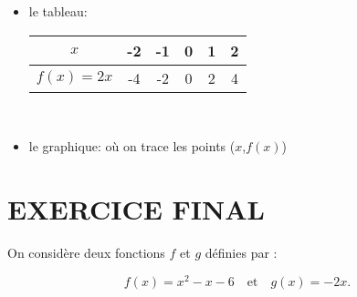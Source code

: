 \documentclass{article}
\begin{document}
\begin{itemize}
    \item le tableau:
   \begin{center}
    \begin{tabular}{|c|c|c|c|c|c|}
        \hline
        \( x \) & -2 & -1 & 0 & 1 & 2 \\ 
        \hline
        \( f(x) = 2x \) & -4 & -2 & 0 & 2 & 4 \\ 
        \hline
    \end{tabular}\\
\end{center}
    \item le graphique: où on trace les points ($x$,$f(x)$)
\begin{center}
\end{center}

\end{itemize}

\section{EXERCICE FINAL}
On considère deux fonctions \( f \) et \( g \) définies par :

\[
f(x) = x^2 - x - 6 \quad \text{et} \quad g(x) = -2x.
\]
\end{document}
